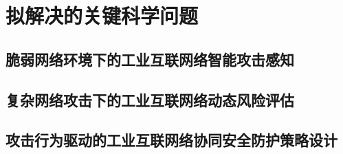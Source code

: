 \section{拟解决的关键科学问题}

\subsection{脆弱网络环境下的工业互联网络智能攻击感知}

\subsection{复杂网络攻击下的工业互联网络动态风险评估}

\subsection{攻击行为驱动的工业互联网络协同安全防护策略设计}